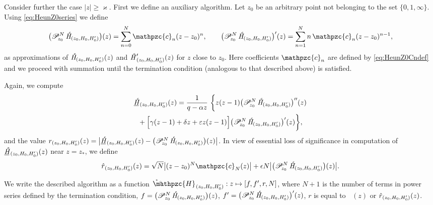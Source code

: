 \documentclass[11pt]{article}
\newcommand{\MF}[1]{\mathop{#1}\nolimits}
\def\reservecoeff{\varkappa}
\def\car{\mathpzc{c}}
\def\HeunC{\displaystyle\setbox0=\hbox{\tiny\itshape\bfseries \kern1.52mm c}\wd0=0pt\ht0=0pt\dp0=0pt\MF{\textit{\hbox{\raise1.67ex\copy0}H\/}}}%
\def\psHeunCo{\setbox0=\hbox{\tiny\itshape\bfseries \kern1.56mm c}\wd0=0pt\ht0=0pt\dp0=0pt%
\setbox1=\hbox{\kern3.475mm\scalebox{0.5}{$\bm{\circ}$}}\wd1=0pt\ht1=0pt\dp1=0pt%
\MF{\hbox{\raise1.67ex\copy0}\hbox{\raise0.95ex\copy1}\mathpzc{H}\kern2pt}}%
\begin{document}
Consider further the case $|z|\geq\reservecoeff$. First we define an
auxiliary algorithm. Let $z_0$ be an arbitrary point not belonging to the set
$\{0,1,\infty\}$. Using \eqref{eq:HeunZ0series} we define
\[
\bigl(\mathscr{P}_{\!z_0}^N\HeunC_{\!(z_0,H_0,H'_0)}\bigr)(z)=\sum_{n=0}^{N}\car_n(z-z_0)^n,\qquad
\bigl(\mathscr{P}_{\!z_0}^N\HeunC_{\!(z_0,H_0,H'_0)}\bigr)'(z)=\sum_{n=1}^{N}n\,\car_n(z-z_0)^{n-1},
\]
as approximations of $\HeunC_{\!(z_0,H_0,H'_0)}(z)$ and
$\HeunC'_{(z_0,H_0,H'_0)}(z)$ for $z$ close to $z_0$. Here coefficients $\car_n$ are defined by  \eqref{eq:HeunZ0Cndef} and we proceed with summation until the termination condition (analogous to that described above) is satisfied.

Again, we compute
\begin{multline*}
  \underline{\HeunC\!}\vphantom{\HeunC}_{\,(z_0,H_0,H'_0)}(z)=\frac{1}{q-\alpha z}\
  \biggl\{z(z-1)\bigl(\mathscr{P}_{\!z_0}^N\HeunC_{\!(z_0,H_0,H'_0)}\bigr)''(z)\\
  {}+
  \Bigl[\gamma(z-1)+\delta z+\varepsilon z(z-1)\Bigr]\bigl(\mathscr{P}_{\!z_0}^N
  \HeunC_{\!(z_0,H_0,H'_0)}\bigr)'(z)\biggr\},
\end{multline*}
and the value
$\MF{r_{(z_0,H_0,H'_0)}}(z)=\bigl|\underline{\HeunC\!}\vphantom{\HeunC}_{\,(z_0,H_0,H'_0)}(z)-
\bigl(\mathscr{P}_{\!z_0}^N\HeunC_{\!(z_0,H_0,H'_0)}\bigr)(z)\bigr|$. In view of
essential loss of significance in computation of
$\underline{\HeunC\!}\vphantom{\HeunC}_{\,(z_0,H_0,H'_0)}(z)$ near $z=z_*$, we define
\begin{equation*}
\MF{\Hat{r}\vphantom{r}_{(z_0,H_0,H'_0)}}(z)=
\sqrt{N}\bigl|(z-z_0)^N\car_N(z)\bigr| + \epsilon N \bigl|\bigl(\mathscr{P}_{\!z_0}^N\HeunC_{\!(z_0,H_0,H'_0)}\bigr)(z)\bigr|.
\end{equation*}

We write the described algorithm as a function 
$\psHeunCo_{\!(z_0,H_0,H'_0)}: z\mapsto [f,f',r,N]$,
where $N+1$ is the number of terms in power series defined by the termination
condition, $f=\bigl(\mathscr{P}_{z_0}^N\HeunC_{\!(z_0,H_0,H'_0)}\bigr)(z)$,
$f'=\bigl(\mathscr{P}_{z_0}^N\HeunC_{\!(z_0,H_0,H'_0)}\bigr)'(z)$, $r$ is equal to $\MF{r_{(z_0,H_0,H'_0)}}(z)$ or $\MF{\Hat{r}\vphantom{r}_{(z_0,H_0,H'_0)}}(z)$.
\end{document}
